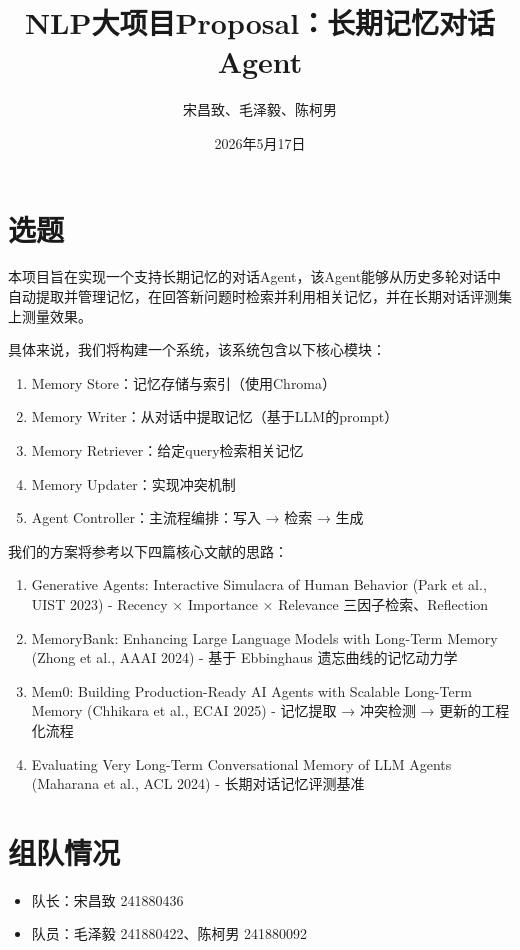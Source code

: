 \documentclass[11pt]{article}
\title{\textbf{NLP大项目Proposal：长期记忆对话Agent}}
\author{宋昌致、毛泽毅、陈柯男}
\date{2026年5月17日}
\begin{document}
\maketitle

\section{选题}

本项目旨在实现一个支持长期记忆的对话Agent，该Agent能够从历史多轮对话中自动提取并管理记忆，在回答新问题时检索并利用相关记忆，并在长期对话评测集上测量效果。

具体来说，我们将构建一个系统，该系统包含以下核心模块：

\begin{enumerate}
\item Memory Store：记忆存储与索引（使用Chroma）
\item Memory Writer：从对话中提取记忆（基于LLM的prompt）
\item Memory Retriever：给定query检索相关记忆
\item Memory Updater：实现冲突机制
\item Agent Controller：主流程编排：写入 → 检索 → 生成
\end{enumerate}

我们的方案将参考以下四篇核心文献的思路：

\begin{enumerate}
\item Generative Agents: Interactive Simulacra of Human Behavior (Park et al., UIST 2023) - Recency × Importance × Relevance 三因子检索、Reflection
\item MemoryBank: Enhancing Large Language Models with Long-Term Memory (Zhong et al., AAAI 2024) - 基于 Ebbinghaus 遗忘曲线的记忆动力学
\item Mem0: Building Production-Ready AI Agents with Scalable Long-Term Memory (Chhikara et al., ECAI 2025) - 记忆提取 → 冲突检测 → 更新的工程化流程
\item Evaluating Very Long-Term Conversational Memory of LLM Agents (Maharana et al., ACL 2024) - 长期对话记忆评测基准
\end{enumerate}

\section{组队情况}

\begin{itemize}
\item 队长：宋昌致 241880436
\item 队员：毛泽毅 241880422、陈柯男 241880092
\end{itemize}
\end{document}
